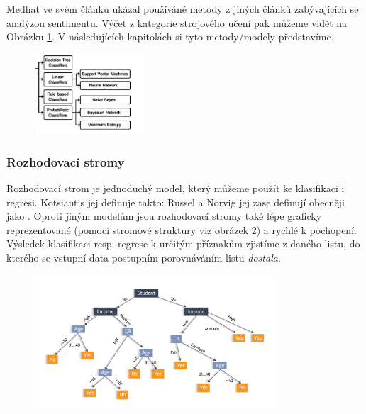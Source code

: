 Medhat ve svém článku ukázal používáné metody z jiných článků zabývajících se analýzou sentimentu. \cite{Medhat} Výčet z kategorie strojového učení pak můžeme vidět na Obrázku \ref{fig:MedhatML}. V následujících kapitolách si tyto metody/modely představíme.

\begin{figure}[h]
    \centering
    \includegraphics[height=3cm]{text/img/medhatML.PNG}
    \caption{}
    \label{fig:MedhatML}
\end{figure}

\subsubsection*{Rozhodovací stromy}
Rozhodovací strom je jednoduchý model, který můžeme použít ke klasifikaci i regresi. Kotsiantis jej definuje takto:  \cite[překlad vlastní]{decisionTree} Russel a Norvig jej zase definují obecněji jako . \cite[překlad vlastní]{aimodern} Oproti jiným modelům jsou rozhodovací stromy také lépe graficky reprezentované (pomocí stromové struktury viz obrázek 
\ref{fig:decisionTree}) a rychlé k pochopení. Výsledek klasifikaci resp. regrese k určitým příznakům zjistíme z daného listu, do kterého se vstupní data postupním porovnáváním listu \textit{dostala}. 



\begin{figure}[h]
    \centering
    \includegraphics[height=5cm]{text/img/decisionTree.png}
    \caption{}
    \label{fig:decisionTree}
\end{figure}

